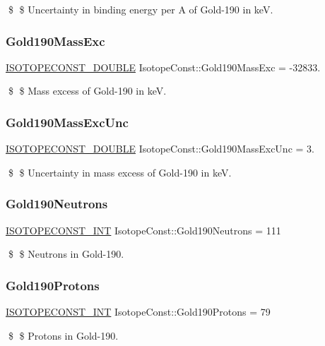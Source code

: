 \$ \$ Uncertainty in binding energy per A of Gold-\/190 in keV. \mbox{\label{group___isotope_const-_gold-_au190_ga527029fdd7add5a2d228537a9f52d5e6}} 
\subsubsection{\texorpdfstring{Gold190\+Mass\+Exc}{Gold190MassExc}}
{\footnotesize\ttfamily \mbox{\hyperlink{group___isotope_const-_macros_ga8f45a7272ce02c0b4c65c44636ed719a}{I\+S\+O\+T\+O\+P\+E\+C\+O\+N\+S\+T\+\_\+\+D\+O\+U\+B\+LE}} Isotope\+Const\+::\+Gold190\+Mass\+Exc = -\/32833.}

\$ \$ Mass excess of Gold-\/190 in keV. \mbox{\label{group___isotope_const-_gold-_au190_ga58164cfcca4fdd0c86b3c4b0e38f835a}} 
\subsubsection{\texorpdfstring{Gold190\+Mass\+Exc\+Unc}{Gold190MassExcUnc}}
{\footnotesize\ttfamily \mbox{\hyperlink{group___isotope_const-_macros_ga8f45a7272ce02c0b4c65c44636ed719a}{I\+S\+O\+T\+O\+P\+E\+C\+O\+N\+S\+T\+\_\+\+D\+O\+U\+B\+LE}} Isotope\+Const\+::\+Gold190\+Mass\+Exc\+Unc = 3.}

\$ \$ Uncertainty in mass excess of Gold-\/190 in keV. \mbox{\label{group___isotope_const-_gold-_au190_gaf9196bb273ca04c90d2117c25e0ce616}} 
\subsubsection{\texorpdfstring{Gold190\+Neutrons}{Gold190Neutrons}}
{\footnotesize\ttfamily \mbox{\hyperlink{group___isotope_const-_macros_ga5f18360b3e99483a35c32d789e62621c}{I\+S\+O\+T\+O\+P\+E\+C\+O\+N\+S\+T\+\_\+\+I\+NT}} Isotope\+Const\+::\+Gold190\+Neutrons = 111}

\$ \$ Neutrons in Gold-\/190. \mbox{\label{group___isotope_const-_gold-_au190_ga34cd0eeda0cda7d9e73aecf3c8ef1c8c}} 
\subsubsection{\texorpdfstring{Gold190\+Protons}{Gold190Protons}}
{\footnotesize\ttfamily \mbox{\hyperlink{group___isotope_const-_macros_ga5f18360b3e99483a35c32d789e62621c}{I\+S\+O\+T\+O\+P\+E\+C\+O\+N\+S\+T\+\_\+\+I\+NT}} Isotope\+Const\+::\+Gold190\+Protons = 79}

\$ \$ Protons in Gold-\/190. 